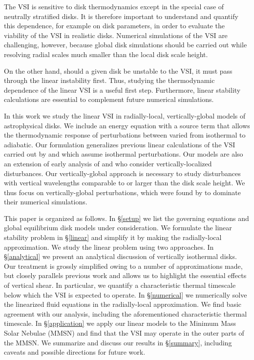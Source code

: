 \documentclass[iop]{emulateapj}
\begin{document}

The VSI is sensitive to disk thermodynamics except
in the special case of neutrally stratified disks. It is therefore
important to understand and quantify this dependence, for example on
disk parameters, in order to evaluate the viability of the VSI in
realistic disks. Numerical simulations of the VSI are challenging,
however, because global disk simulations should be carried out while
resolving radial scales much smaller than the local disk scale height.   

On the other hand, should a given disk be
unstable to the VSI, it must pass through the linear instability
first. Thus, studying the thermodynamic dependence of the linear VSI
is a useful first step. Furthermore, linear stability calculations are
essential to complement future numerical simulations.  

In this work we study the linear VSI in radially-local,
vertically-global models of astrophysical disks. We include an energy
equation with a source term that allows the thermodynamic response of
perturbations between varied from isothermal to adiabatic. Our
formulation generalizes previous linear calculations of the 
VSI carried out by \cite{nelson13} and \cite{mcnally14} which assume
isothermal perturbations. Our models are also an extension of early
analysis of \cite{urpin98} and \cite{urpin03} who consider
vertically-localized disturbances. Our vertically-global approach is
necessary to study disturbances with vertical wavelengths
comparable to or larger than the disk scale height. We thus focus on
vertically-global perturbations, which were found by \cite{nelson13}
to dominate their numerical simulations. 



This paper is organized as follows. In \S\ref{setup} we list the
governing equations and global equilibrium disk models under
consideration. We formulate the linear stability problem in
\S\ref{linear} and simplify it by making the radially-local
approximation. We study the linear problem using two approaches. In
\S\ref{analytical} we present an analytical discussion of vertically
isothermal disks. Our treatment is grossly simplified owing to a
number of approximations made, but closely parallels previous work and 
allows us to highlight the essential effects of vertical shear. In
particular, we quantify a characteristic thermal timescale below which
the VSI is expected to operate. In \S\ref{numerical} we numerically
solve the linearized fluid equations in the radially-local
approximation. We find basic agreement with our analysis, including
the aforementioned characteristic thermal timescale. In
\S\ref{application} we apply our linear models to the Minimum Mass
Solar Nebulae (MMSN) and find that the VSI may operate in the outer
parts of the MMSN. We summarize and discuss our results in
\S\ref{summary}, including caveats and possible directions for future
work.  







 


\appendix




\end{document}
